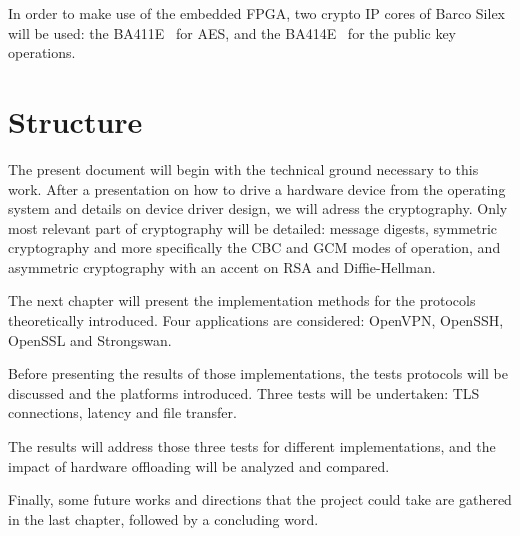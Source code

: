 In order to make use of the embedded FPGA, two crypto IP cores of Barco Silex will be used: the BA411E~\cite{barco-ba411e} for AES, and the BA414E~\cite{barco-ba414e} for the public key operations.




\section{Structure}
The present document will begin with the technical ground necessary to this work.
After a presentation on how to drive a hardware device from the operating system and details on device driver design, we will adress the cryptography.
Only most relevant part of cryptography will be detailed: message digests, symmetric cryptography and more specifically the CBC and GCM modes of operation, and asymmetric cryptography with an accent on RSA and Diffie-Hellman.

The next chapter will present the implementation methods for the protocols theoretically introduced.
Four applications are considered: OpenVPN, OpenSSH, OpenSSL and Strongswan.

Before presenting the results of those implementations, the tests protocols will be discussed and the platforms introduced.
Three tests will be undertaken: TLS connections, latency and file transfer.

The results will address those three tests for different implementations, and the impact of hardware offloading will be analyzed and compared.

Finally, some future works and directions that the project could take are gathered in the last chapter, followed by a concluding word.